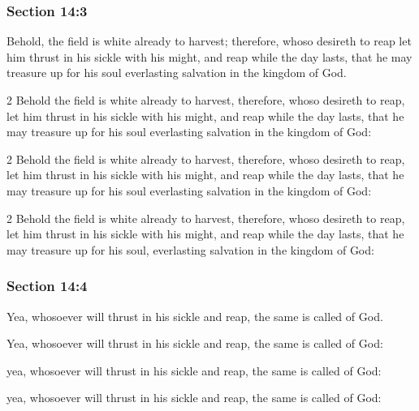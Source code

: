 	\subsubsection{Section 14:3} %
		\label{DC14-3}

		Behold, the field is white already to harvest; therefore, whoso desireth to reap let him thrust in his sickle with his might, and reap while the day lasts, that he may treasure up for his soul everlasting salvation in the kingdom of God.

		\begin{framed}
		\scriptsize
			\begin{compactdesc}
				\item[JSP] 2 Behold the field is white already to harvest, therefore, whoso desireth to reap, let him thrust in his sickle with his might, and reap while the day lasts, that he may treasure up for his soul everlasting salvation in the kingdom of God: 
				\item[DC 1835] 2 Behold the field is white already to harvest, therefore, whoso desireth to reap, let him thrust in his sickle with his might, and reap while the day lasts, that he may treasure up for his soul everlasting salvation in the kingdom of God: 
				\item[DC 1844] 2 Behold the field is white already to harvest, therefore, whoso desireth to reap, let him thrust in his sickle with his might, and reap while the day lasts, that he may treasure up for his soul, everlasting salvation in the kingdom of God: 
			\end{compactdesc}
		\end{framed}

	\subsubsection{Section 14:4} %
		\label{DC14-4}

		Yea, whosoever will thrust in his sickle and reap, the same is called of God.

		\begin{framed}
		\scriptsize
			\begin{compactdesc}
				\item[JSP] Yea, whosoever will thrust in his sickle and reap, the same is called of God: 
				\item[DC 1835] yea, whosoever will thrust in his sickle and reap, the same is called of God: 
				\item[DC 1844] yea, whosoever will thrust in his sickle and reap, the same is called of God:
			\end{compactdesc}
		\end{framed}

